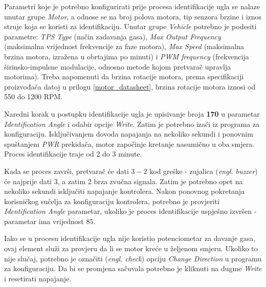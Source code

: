 Parametri koje je potrebno konfigurirati prije procesa identifikacije ugla se nalaze unutar grupe \textit{Motor}, a odnose se na broj polova motora, tip senzora brzine i iznos struje koja se koristi za identifikaciju. Unutar grupe \textit{Vehicle} potrebno je podesiti parametre: \textit{TPS Type} (način zadavanja gasa), \textit{Max Output Frequency} (maksimalna vrijednost frekvencije za faze motora), \textit{Max Speed} (maksimalna brzina motora, izražena u obrtajima po minuti) i \textit{PWM frequency} (frekvencija širinsko-impulsne modulacije, odnosno metode kojom pretvarač upravlja motorima). Treba napomenuti da brzina rotacije motora, prema specifikaciji proizvođača datoj u prilogu \ref{motor_datasheet}, brzina rotacije motora iznosi od 550 do 1200 RPM.

Naredni korak u postupku identifikacije ugla je upisivanje broja \textbf{170} u parametar \textit{Identification Angle} i odabir opcije \textit{Write}. Zatim je potrebno izaći iz programa za konfiguraciju. Isključivanjem dovoda napajanja na nekoliko sekundi i ponovnim spuštanjem \textit{PWR} prekidača, motor započinje kretanje nasumično u oba smjera. Proces identifikacije traje od 2 do 3 minute.

Kada se proces završi, pretvarač će dati $3-2$ kod greške - zujalica (\textit{engl. buzzer}) će najprije dati 3, a zatim 2 brza zvučna signala. Zatim je potrebno opet na nekoliko sekundi isključiti napajanje kontrolera. Nakon ponovnog pokretanja korisničkog sučelja za konfiguraciju kontrolera, potrebno je provjeriti \textit{Identification Angle} parametar, ukoliko je proces identifikacije uspješno izvršen - parametar ima vrijednost 85.

Iako se u procesu identifikacije ugla nije koristio potenciometar za davanje gasa, ovaj element služi za provjeru da li se motor kreće u željenom smjeru. Ukoliko to nije slučaj, potrebno je označiti (\textit{engl. check}) opciju \textit{Change Direction} u programu za konfiguraciju. Da bi se promjena sačuvala potrebno je kliknuti na dugme \textit{Write} i resetirati napajanje.


